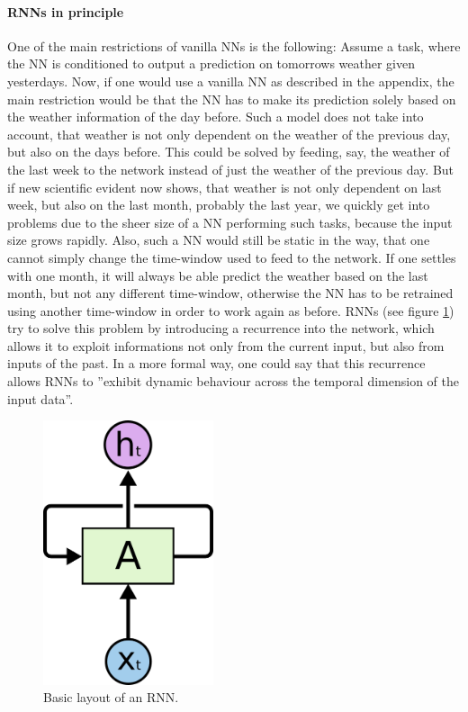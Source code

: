 \paragraph{RNNs in principle}
One of the main restrictions of vanilla NNs is the following: Assume a task, where the NN is conditioned to output a prediction on tomorrows weather given yesterdays. Now, if one would use a vanilla NN as described in the appendix, the main restriction would be that the NN has to make its prediction solely based on the weather information of the day before. Such a model does not take into account, that weather is not only dependent on the weather of the previous day, but also on the days before. This could be solved by feeding, say, the weather of the last week to the network instead of just the weather of the previous day. But if new scientific evident now shows, that weather is not only dependent on last week, but also on the last month, probably the last year, we quickly get into problems due to the sheer size of a NN performing such tasks, because the input size grows rapidly. Also, such a NN would still be static in the way, that one cannot simply change the time-window used to feed to the network. If one settles with one month, it will always be able predict the weather based on the last month, but not any different time-window, otherwise the NN has to be retrained using another time-window in order to work again as before. RNNs (see figure \ref{fundamentals:rnn:rolled_vanilla}) try to solve this problem by introducing a recurrence into the network, which allows it to exploit informations not only from the current input, but also from inputs of the past. In a more formal way, one could say that this recurrence allows RNNs to ''exhibit dynamic behaviour across the temporal dimension of the input data''.

\begin{figure}[h]
	\label{fundamentals:rnn:rolled_vanilla}
	\centering
	\includegraphics[width=5cm]{img/rnn_rolled}
	\caption{Basic layout of an RNN.\protect\footnotemark}
\end{figure}

